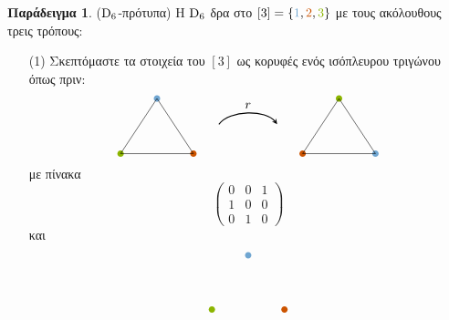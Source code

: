 \documentclass[12pt,a4paper,reqno]{amsart}
\theoremstyle{definition}
\newtheorem*{example}{Παράδειγμα}
\newcommand{\one}{\textcolor{iceberg}{1}}
\newcommand{\two}{\textcolor{burntorange}{2}}
\newcommand{\three}{\textcolor{applegreen}{3}}
\begin{document}
\begin{example}{\rm($\mathrm{D}_6$-πρότυπα)}
    Η $\mathrm{D}_6$ δρα στο $[3]=\{\one, \two, \three\}$ με τους ακόλουθους τρεις τρόπους:
    \begin{itemize}
        \item[(1)] Σκεπτόμαστε τα στοιχεία του $[3]$ ως κορυφές ενός ισόπλευρου τριγώνου όπως πριν: 
        \[
    \begin{tikzpicture}[>=stealth]
        \tikzstyle{point}=[circle,fill,inner sep=0pt, minimum width=5pt, minimum height=5pt]
        \begin{scope}[shift={(-1,-.5)}]
            \node[iceberg] (e3)[point] at (1,1.5) {};
            \node[burntorange] (e1)[point] at (2,0) {};
            \node[applegreen] (e2)[point] at (0,0) {};

            \coordinate (bary) at (1,0.5) {}; 

            \draw (e1.center) -- (e2.center) -- (e3.center) -- cycle;
        \end{scope}
    \draw[->, thick]
    (1.7,0.3) .. controls (2,0.7) and (3,0.7) .. (3.3,0.3)
    node[midway, above] {$r$};

        \begin{scope}[shift={(4,-.5)}]
            \node[applegreen] (e3)[point] at (1,1.5) {};
            \node[iceberg] (e1)[point] at (2,0) {};
            \node[burntorange] (e2)[point] at (0,0) {};

            \coordinate (bary) at (1,0.5) {}; 

            \draw (e1.center) -- (e2.center) -- (e3.center) -- cycle;
        \end{scope}
    \end{tikzpicture}
    \]
        με πίνακα 
        \[
    \begin{pmatrix}
        0 & 0 & 1 \\
        1 & 0 & 0 \\
        0 & 1 & 0
    \end{pmatrix}
    \]
    και 
    \[
    \begin{tikzpicture}[>=stealth]
        \tikzstyle{point}=[circle,fill,inner sep=0pt, minimum width=5pt, minimum height=5pt]
        \begin{scope}[shift={(-1,-.5)}]
            \node[iceberg] (e3)[point] at (1,1.5) {};
            \node[burntorange] (e1)[point] at (2,0) {};
            \node[applegreen] (e2)[point] at (0,0) {};


\end{scope}
\end{tikzpicture}\]
\end{itemize}
\end{example}
\end{document}
